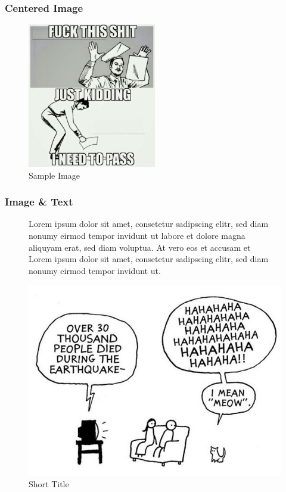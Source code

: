 \subsubsection{Centered Image}
\begin{figure}[H]
	\centering
	\includegraphics[width=0.5\textwidth]{img/sample}
	\caption{Sample Image}
	\label{fig:Sample Image}
\end{figure}

\subsubsection{Image \& Text}
\begin{figure}[H]
	\begin{minipage}{0.55\textwidth}
		Lorem ipsum dolor sit amet, consetetur sadipscing elitr, sed diam 
		nonumy eirmod tempor invidunt ut labore et dolore magna aliquyam erat, 
		sed diam voluptua. At vero eos et accusam et\\
		
		Lorem ipsum dolor sit amet, consetetur sadipscing elitr, sed diam 
		nonumy eirmod tempor invidunt ut.\\
	\end{minipage}
	\begin{minipage}{0.4\textwidth}
		\centering
		\includegraphics[width=1\textwidth]{img/meow}
		\caption[Title with special Characters]{Short Title}
		\label{fig:Image and Text}
	\end{minipage}
\end{figure}

